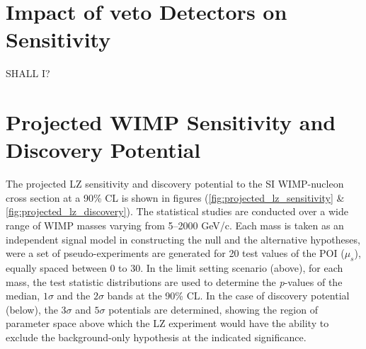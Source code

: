 {%
\section{Impact of veto Detectors on Sensitivity}
\label{sec:lz_veto_sensitivity}

SHALL I?

\section{Projected WIMP Sensitivity and Discovery Potential}
\label{sec:lz_sensitivity}

The projected LZ sensitivity and discovery potential to the SI WIMP-nucleon cross section at a 90\% CL is shown in figures (\ref{fig:projected_lz_sensitivity} \& \ref{fig:projected_lz_discovery}). The statistical studies are conducted over a wide range of WIMP masses varying from 5--2000 GeV/c\squared{}. Each mass is taken as an independent signal model in constructing the null and the alternative hypotheses, were a set of pseudo-experiments are generated for 20 test values of the POI ($\mu_{s}$), equally spaced between 0 to 30. In the limit setting scenario (above), for each mass, the test statistic distributions are used to determine the \textit{p}-values of the median, $1\sigma$ and the $2\sigma$ bands at the 90\% CL. In the case of discovery potential (below), the $3\sigma$ and $5\sigma$ potentials are determined, showing the region of parameter space above which the LZ experiment would have the ability to exclude the background-only hypothesis at the indicated significance.

}
